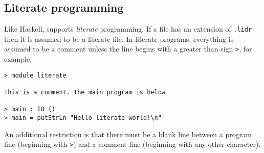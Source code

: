 \subsection{Literate programming}

Like Haskell, \Idris{} supports \emph{literate} programming.
If a file has an extension of \texttt{.lidr} then it is assumed to be a literate file.
In literate programs, everything is assumed to be a comment unless the line begins with a greater than sign \texttt{>}, for example:

\begin{lstlisting}
> module literate

This is a comment. The main program is below

> main : IO ()
> main = putStrLn "Hello literate world!\n"
\end{lstlisting}

\noindent
An additional restriction is that there must be a blank line between a program line (beginning with \texttt{>}) and a comment line (beginning with any other character).

